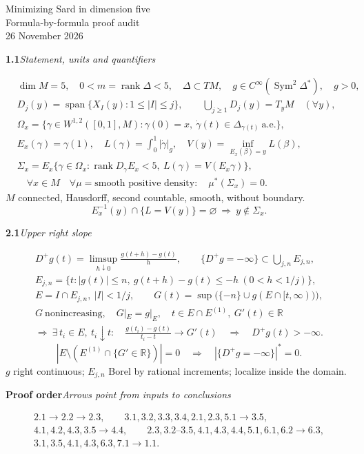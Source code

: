 \documentclass[11pt]{article}
\newcommand{\R}{\mathbb R}
\newcommand{\rk}{\operatorname{rank}}
\newcommand{\rowhead}[2]{\par\medskip\noindent\textbf{#1}\quad\textit{#2}\par}
\begin{document}
\begin{center}
{\LARGE Minimizing Sard in dimension five}\\[3pt]
{\large Formula-by-formula proof audit}\\[3pt]
26 November 2026
\end{center}
\rowhead{1.1}{Statement, units and quantifiers}
\begin{align*}
 &\dim M=5,\quad 0<m=\rk\Delta<5,\quad \Delta\subset TM,\quad
   g\in C^\infty(\operatorname{Sym}^2\Delta^*),\quad g>0,\\
 &D_j(y)=\operatorname{span}\{X_I(y):1\le |I|\le j\},\qquad
              \bigcup_{j\ge1} D_j(y)=T_yM\quad(\forall y),\\
 &\Omega_x=\{\gamma\in W^{1,2}([0,1],M):
    \gamma(0)=x,\ \dot\gamma(t)\in\Delta_{\gamma(t)}\ \text{a.e.}\},\\
 &E_x(\gamma)=\gamma(1),\quad L(\gamma)=\int_0^1|\dot\gamma|_g,\quad
     V(y)=\inf_{E_x(\beta)=y}L(\beta),\\
 &\Sigma_x=E_x\{\gamma\in\Omega_x:
         \rk D_\gamma E_x<5,\ L(\gamma)=V(E_x\gamma)\},\\[-2pt]
 &\boxed{\quad\forall x\in M\quad\forall\mu=\text{smooth positive density}:
      \quad\mu^*(\Sigma_x)=0.\quad}
\end{align*}
$M$ connected, Hausdorff, second countable, smooth, without boundary.
\[
 E_x^{-1}(y)\cap\{L=V(y)\}=\varnothing\ \Longrightarrow\ y\notin\Sigma_x .
\]
\rowhead{2.1}{Upper right slope}
\begin{gather*}
 D^+g(t)=\limsup_{h\downarrow0}\frac{g(t+h)-g(t)}h,\qquad
 \{D^+g=-\infty\}\subset\bigcup_{j,n}E_{j,n},\\
 E_{j,n}=\{t: |g(t)|\le n,\ g(t+h)-g(t)\le-h\ (0<h<1/j)\},\\
 E=I\cap E_{j,n},\ |I|<1/j,\qquad
 G(t)=\sup\big(\{-n\}\cup g(E\cap[t,\infty))\big),\\
 G\ \text{nonincreasing},\quad G|_E=g|_E,\quad
 t\in E\cap E^{(1)},\ G'(t)\in\R\\
 \Longrightarrow\ \exists\,t_i\in E,\ t_i\downarrow t:
 \quad\frac{g(t_i)-g(t)}{t_i-t}\longrightarrow G'(t)
 \quad\Longrightarrow\quad D^+g(t)>-\infty .
\end{gather*}
\[ |E\setminus(E^{(1)}\cap\{G'\in\R\})|=0
 \quad\Longrightarrow\quad |\{D^+g=-\infty\}|^*=0 . \]
$g$ right continuous; $E_{j,n}$ Borel by rational increments; localize inside the domain.
\rowhead{Proof order}{Arrows point from inputs to conclusions}
\[
\begin{gathered}
 2.1\to2.2\to2.3,\qquad 3.1,3.2,3.3,3.4,2.1,2.3,5.1\to3.5,\\
 4.1,4.2,4.3,3.5\to4.4,\qquad
 2.3,3.2\text{--}3.5,4.1,4.3,4.4,5.1,6.1,6.2\to6.3,\\
 3.1,3.5,4.1,4.3,6.3,7.1\to1.1 .
\end{gathered}
\]
\end{document}
